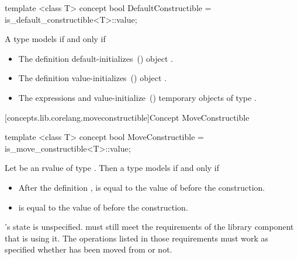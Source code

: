 \begin{addedblock}
%
\begin{itemdecl}
template <class T>
concept bool DefaultConstructible =
  is_default_constructible<T>::value;
\end{itemdecl}

\begin{itemdescr}
\pnum
A type  models  if and only if

\begin{itemize}
\item The definition  default-initializes~()
object .
\item The definition  value-initializes~()
object .
\item The expressions  and  value-initialize~()
temporary objects of type .
\end{itemize}

\end{itemdescr}

[concepts.lib.corelang.moveconstructible]{Concept MoveConstructible}

%
\begin{itemdecl}
template <class T>
concept bool MoveConstructible =
  is_move_constructible<T>::value;
\end{itemdecl}

\begin{itemdescr}
\pnum
Let  be an rvalue of type . Then a type  models
 if and only if

\begin{itemize}
\item After the definition ,  is equal to the value of
 before the construction.
\item {} is equal to the value of  before the construction.
\end{itemize}

\pnum
{}'s state is unspecified. \enternote {} must still meet the
requirements of the library component that is using it. The operations listed
in those requirements must work as specified whether  has been moved
from or not.\exitnote
\end{itemdescr}


\end{addedblock}
